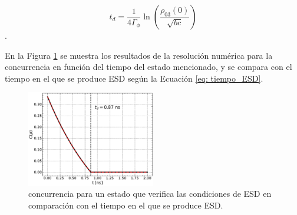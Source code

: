 
\begin{equation} \label{eq: tiempo_ESD}
    t_d = \frac{1}{4 \Gamma_\phi} \ln \left(\frac{\rho_{03}(0)}{\sqrt{bc}}\right)
\end{equation}.

En la Figura \ref{fig: concurrencia_death_state} se muestra los resultados de la resolución numérica para la concurrencia en función del tiempo del estado mencionado, y se compara con el tiempo en el que se produce ESD según la Ecuación \ref{eq: tiempo_ESD}.

\begin{figure} [htbp]
    \centering
    \includegraphics[width=0.5\textwidth]{figures/concurrence_death_state.pdf}
    \caption{concurrencia para un estado que verifica las condiciones de ESD en comparación con el tiempo en el que se produce ESD.}
    \label{fig: concurrencia_death_state}
\end{figure}